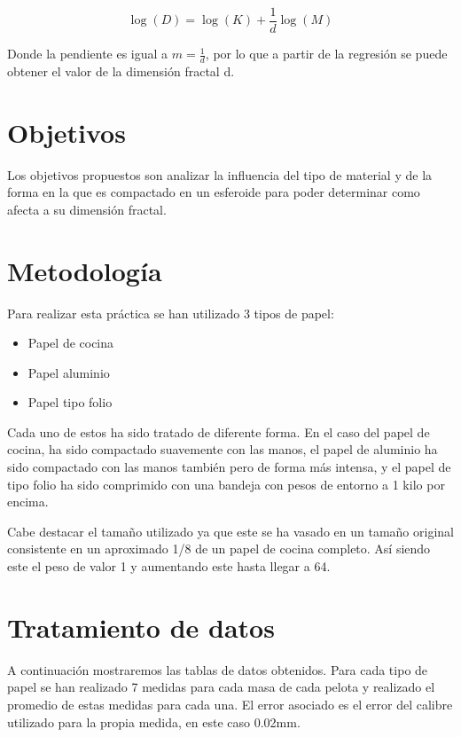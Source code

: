 \documentclass[11pt, a4paper, twocolumn]{article}
\begin{document}
\begin{equation}
    \log(D) = \log(K) + \frac{1}{d} \log(M)
\end{equation}

Donde la pendiente es igual a $m = \frac{1}{d}$, por lo que a partir de la regresión 
se puede obtener el valor de la dimensión fractal d.
\section{Objetivos}
Los objetivos propuestos son analizar la influencia del tipo de material y de la forma en la que es compactado en un esferoide para poder 
determinar como afecta a su dimensión fractal. 
\section{Metodología}

Para realizar esta práctica se han utilizado 3 tipos de papel: 
\begin{itemize}
    \item Papel de cocina
    \item Papel aluminio
    \item Papel tipo folio
\end{itemize}

Cada uno de estos ha sido tratado de diferente forma. En el caso del papel de cocina, ha sido compactado suavemente con las manos, 
el papel de aluminio ha sido compactado con las manos también pero de forma más intensa, y el papel de tipo folio ha sido comprimido 
con una bandeja con pesos de entorno a 1 kilo por encima. 

\vspace{0.2cm}

Cabe destacar el tamaño utilizado ya que este se ha vasado en un tamaño original consistente en un aproximado 1/8 de un papel de cocina completo. Así siendo este el 
peso de valor 1 y aumentando este hasta llegar a 64.  
\section{Tratamiento de datos}

A continuación mostraremos las tablas de datos obtenidos. Para cada tipo de papel se han realizado 7 medidas para cada masa de cada pelota
y realizado el promedio de estas medidas para cada una. El error asociado es el error del calibre utilizado para la propia medida, en este caso 0.02mm.

\vspace{0.5cm}
\end{document}
